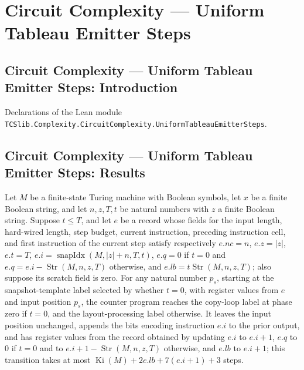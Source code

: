\section{Circuit Complexity --- Uniform Tableau Emitter Steps}
\subsection*{Circuit Complexity --- Uniform Tableau Emitter Steps: Introduction}

Declarations of the Lean module \texttt{TCSlib.Complexity.CircuitComplexity.UniformTableauEmitterSteps}.

\subsection*{Circuit Complexity --- Uniform Tableau Emitter Steps: Results}

\begin{theorem}
\label{Complexity.UTab.goes_snap}
\leanok
{}
Let $M$ be a finite-state Turing machine with Boolean symbols, let $x$ be a finite
Boolean string, and let $n,z,T,t$ be natural numbers with $z$ a finite Boolean string.
Suppose $t\le T$, and let $e$ be a record whose fields for the input length, hard-wired
length, step budget, current instruction, preceding instruction cell, and first
instruction of the current step satisfy respectively $e.nc=n$, $e.z=|z|$, $e.t=T$,
$e.i=\operatorname{snapIdx}(M,|z|+n,T,t)$, $e.q=0$ if $t=0$ and
$e.q=e.i-\operatorname{Str}(M,n,z,T)$ otherwise, and
$e.lb=t\operatorname{Str}(M,n,z,T)$; also suppose its scratch field is zero. For any
natural number $p_s$, starting at the snapshot-template label selected by whether $t=0$,
with register values from $e$ and input position $p_s$, the counter program reaches the
copy-loop label at phase zero if $t=0$, and the layout-processing label otherwise. It
leaves the input position unchanged, appends the bits encoding instruction $e.i$ to the
prior output, and has register values from the record obtained by updating $e.i$ to
$e.i+1$, $e.q$ to $0$ if $t=0$ and to $e.i+1-\operatorname{Str}(M,n,z,T)$ otherwise, and
$e.lb$ to $e.i+1$; this transition takes at most $\operatorname{Ki}(M)+2e.lb+7(e.i+1)+3$
steps.
\end{theorem}

